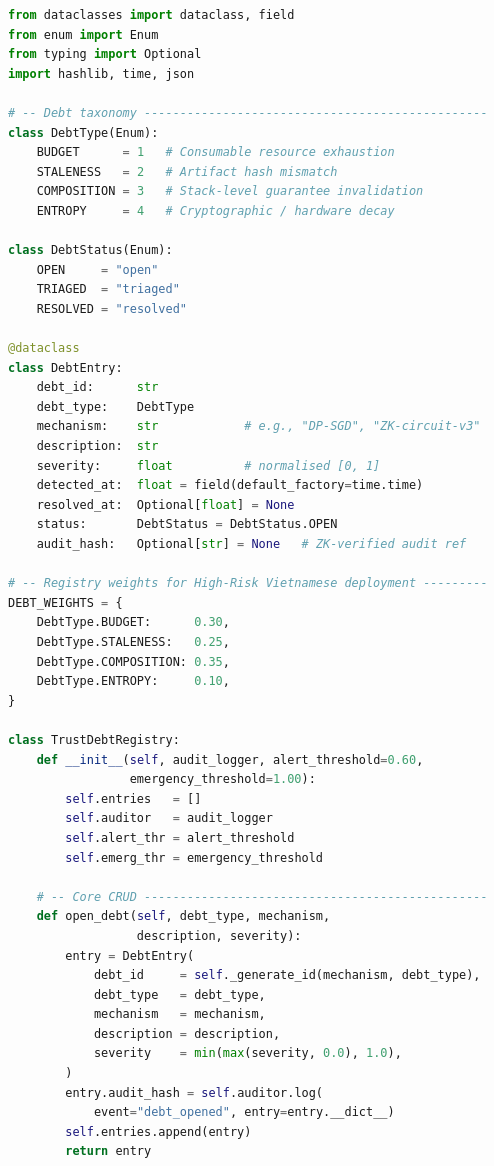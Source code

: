 \begin{lstlisting}[language=Python, style=pythonstyle,
  caption={Trust Debt Registry: unified tracking and scoring
           for all four Trustworthy AI debt types across the
           full mechanism stack.},
  label={lst:debt-registry}
]
from dataclasses import dataclass, field
from enum import Enum
from typing import Optional
import hashlib, time, json

# -- Debt taxonomy ------------------------------------------------
class DebtType(Enum):
    BUDGET      = 1   # Consumable resource exhaustion
    STALENESS   = 2   # Artifact hash mismatch
    COMPOSITION = 3   # Stack-level guarantee invalidation
    ENTROPY     = 4   # Cryptographic / hardware decay

class DebtStatus(Enum):
    OPEN     = "open"
    TRIAGED  = "triaged"
    RESOLVED = "resolved"

@dataclass
class DebtEntry:
    debt_id:      str
    debt_type:    DebtType
    mechanism:    str            # e.g., "DP-SGD", "ZK-circuit-v3"
    description:  str
    severity:     float          # normalised [0, 1]
    detected_at:  float = field(default_factory=time.time)
    resolved_at:  Optional[float] = None
    status:       DebtStatus = DebtStatus.OPEN
    audit_hash:   Optional[str] = None   # ZK-verified audit ref

# -- Registry weights for High-Risk Vietnamese deployment ---------
DEBT_WEIGHTS = {
    DebtType.BUDGET:      0.30,
    DebtType.STALENESS:   0.25,
    DebtType.COMPOSITION: 0.35,
    DebtType.ENTROPY:     0.10,
}

class TrustDebtRegistry:
    def __init__(self, audit_logger, alert_threshold=0.60,
                 emergency_threshold=1.00):
        self.entries   = []
        self.auditor   = audit_logger
        self.alert_thr = alert_threshold
        self.emerg_thr = emergency_threshold

    # -- Core CRUD ------------------------------------------------
    def open_debt(self, debt_type, mechanism,
                  description, severity):
        entry = DebtEntry(
            debt_id     = self._generate_id(mechanism, debt_type),
            debt_type   = debt_type,
            mechanism   = mechanism,
            description = description,
            severity    = min(max(severity, 0.0), 1.0),
        )
        entry.audit_hash = self.auditor.log(
            event="debt_opened", entry=entry.__dict__)
        self.entries.append(entry)
        return entry


\end{lstlisting}
